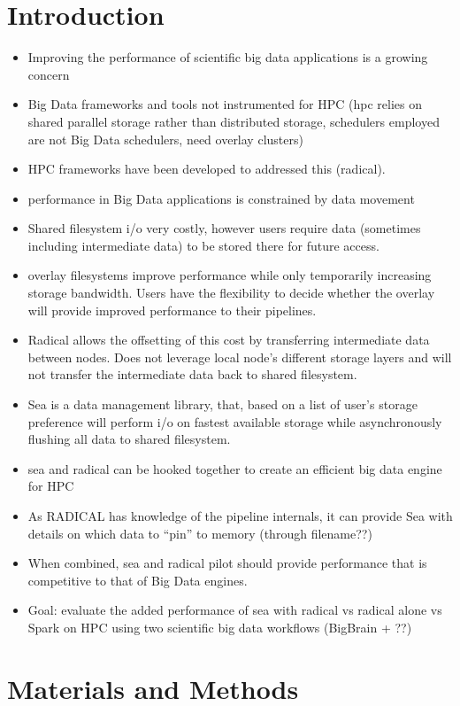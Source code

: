 \documentclass[conference]{IEEEtran}
\begin{document}
\section{Introduction}
\begin{itemize}
\item Improving the performance of scientific big data applications is a growing 
    concern
\item Big Data frameworks and tools not instrumented for HPC (hpc relies on 
    shared parallel storage rather than distributed storage, schedulers employed 
are not Big Data schedulers, need overlay clusters)
\item HPC frameworks have been developed to addressed this (radical).
\item performance in Big Data applications is constrained by data movement
\item Shared filesystem i/o very costly, however users require data (sometimes 
    including intermediate data) to be stored there for future access.
\item overlay filesystems improve performance while only temporarily increasing
    storage bandwidth. Users have the flexibility to decide whether the overlay
    will provide improved performance to their pipelines.
\item Radical allows the offsetting of this cost by transferring intermediate
    data between nodes. Does not leverage local node's different storage layers
    and will not transfer the intermediate data back to shared filesystem.
\item Sea is a data management library, that, based on a list of user's storage 
    preference will perform i/o on fastest available storage while 
    asynchronously flushing all data to shared filesystem.
\item sea and radical can be hooked together to create an efficient big data
    engine for HPC
\item As RADICAL has knowledge of the pipeline internals, it can provide Sea
    with details on which data to ``pin'' to memory (through filename??)
\item When combined, sea and radical pilot should provide performance that is
    competitive to that of Big Data engines.
\item Goal: evaluate the added performance of sea with radical vs radical alone 
    vs Spark on HPC using two scientific big data workflows (BigBrain + ??)
\end{itemize}
\section{Materials and Methods}
\end{document}
